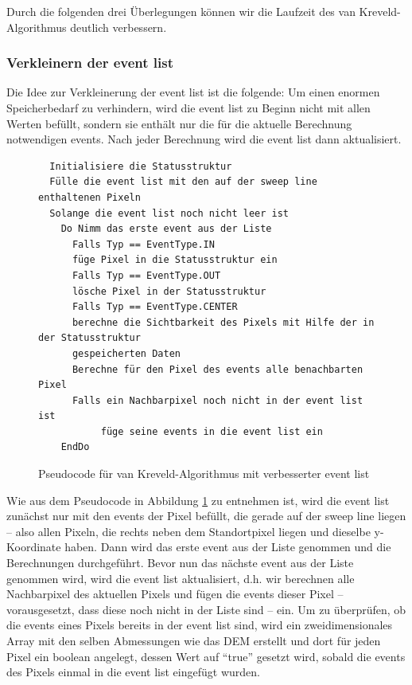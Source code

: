Durch die folgenden drei Überlegungen können wir die Laufzeit des van Kreveld-Algorithmus deutlich verbessern.

\subsubsection{Verkleinern der event list}
\label{ev_klein}
Die Idee zur Verkleinerung der event list ist die folgende: Um einen enormen Speicherbedarf zu verhindern, wird die event list zu Beginn nicht mit 
allen Werten befüllt, sondern sie enthält nur die für die aktuelle Berechnung notwendigen events. Nach jeder Berechnung wird die event list dann 
aktualisiert. 

\begin{figure}[!ht]
 \centering
 \begin{BVerbatim}
  Initialisiere die Statusstruktur 
  Fülle die event list mit den auf der sweep line enthaltenen Pixeln 
  Solange die event list noch nicht leer ist 
    Do Nimm das erste event aus der Liste 
      Falls Typ == EventType.IN
	  füge Pixel in die Statusstruktur ein
      Falls Typ == EventType.OUT
	  lösche Pixel in der Statusstruktur 
      Falls Typ == EventType.CENTER
	  berechne die Sichtbarkeit des Pixels mit Hilfe der in der Statusstruktur 
	  gespeicherten Daten
      Berechne für den Pixel des events alle benachbarten Pixel 
	  Falls ein Nachbarpixel noch nicht in der event list ist
	       füge seine events in die event list ein
    EndDo

 \end{BVerbatim}
 \caption{Pseudocode für van Kreveld-Algorithmus mit verbesserter event list}
 \label{pseudo_krev_ev_klein}
\end{figure}

Wie aus dem Pseudocode in Abbildung \ref{pseudo_krev_ev_klein} zu entnehmen ist, wird die event list zunächst nur mit den events der Pixel befüllt,
die gerade auf der sweep line liegen -- also allen Pixeln, die rechts neben dem Standortpixel liegen und dieselbe y-Koordinate haben. Dann wird das 
erste event aus der Liste genommen und die Berechnungen durchgeführt. Bevor nun das nächste event aus der Liste genommen wird, wird die event list 
aktualisiert, d.h. wir berechnen alle Nachbarpixel des aktuellen Pixels und fügen die events dieser Pixel -- vorausgesetzt, dass diese noch nicht in 
der Liste sind -- ein. Um zu überprüfen, ob die events eines Pixels bereits in der event list sind, wird ein zweidimensionales Array mit 
den selben Abmessungen wie das DEM erstellt und dort für jeden Pixel ein boolean angelegt, dessen Wert auf ``true'' gesetzt wird, sobald die events 
des Pixels einmal in die event list eingefügt wurden.

